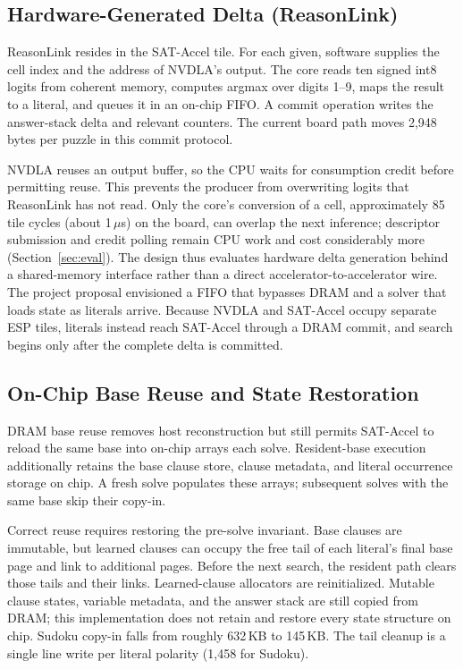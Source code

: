\subsection{Hardware-Generated Delta (ReasonLink)}
ReasonLink resides in the SAT-Accel tile. For each given, software supplies the cell index and the address of NVDLA's output. The core reads ten signed int8 logits from coherent memory, computes argmax over digits 1--9, maps the result to a literal, and queues it in an on-chip FIFO. A commit operation writes the answer-stack delta and relevant counters. The current board path moves 2,948 bytes per puzzle in this commit protocol.

NVDLA reuses an output buffer, so the CPU waits for consumption credit before permitting reuse. This prevents the producer from overwriting logits that ReasonLink has not read. Only the core's conversion of a cell, approximately 85 tile cycles (about 1\,$\mu$s) on the board, can overlap the next inference; descriptor submission and credit polling remain CPU work and cost considerably more (Section~\ref{sec:eval}). The design thus evaluates hardware delta generation behind a shared-memory interface rather than a direct accelerator-to-accelerator wire. The project proposal envisioned a FIFO that bypasses DRAM and a solver that loads state as literals arrive. Because NVDLA and SAT-Accel occupy separate ESP tiles, literals instead reach SAT-Accel through a DRAM commit, and search begins only after the complete delta is committed.


\subsection{On-Chip Base Reuse and State Restoration}
DRAM base reuse removes host reconstruction but still permits SAT-Accel to reload the same base into on-chip arrays each solve. Resident-base execution additionally retains the base clause store, clause metadata, and literal occurrence storage on chip. A fresh solve populates these arrays; subsequent solves with the same base skip their copy-in.

Correct reuse requires restoring the pre-solve invariant. Base clauses are immutable, but learned clauses can occupy the free tail of each literal's final base page and link to additional pages. Before the next search, the resident path clears those tails and their links. Learned-clause allocators are reinitialized. Mutable clause states, variable metadata, and the answer stack are still copied from DRAM; this implementation does not retain and restore every state structure on chip. Sudoku copy-in falls from roughly 632\,KB to 145\,KB. The tail cleanup is a single line write per literal polarity (1,458 for Sudoku).

